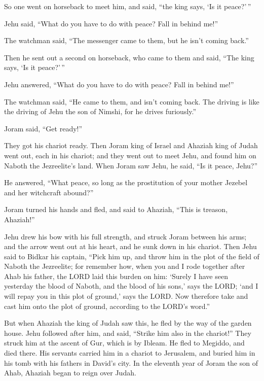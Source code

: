  So one went on horseback to meet him, and said, ``the
king says, `Is it peace?'\,''

Jehu said, ``What do you have to do with peace? Fall in behind me!''

The watchman said, ``The messenger came to them, but he isn't coming
back.''

 Then he sent out a second on horseback, who came to them
and said, ``The king says, `Is it peace?'\,''

Jehu answered, ``What do you have to do with peace? Fall in behind me!''

 The watchman said, ``He came to them, and isn't coming
back. The driving is like the driving of Jehu the son of Nimshi, for he
drives furiously.''

 Joram said, ``Get ready!''

They got his chariot ready. Then Joram king of Israel and Ahaziah king
of Judah went out, each in his chariot; and they went out to meet Jehu,
and found him on Naboth the Jezreelite's land.  When
Joram saw Jehu, he said, ``Is it peace, Jehu?''

He answered, ``What peace, so long as the prostitution of your mother
Jezebel and her witchcraft abound?''

 Joram turned his hands and fled, and said to Ahaziah,
``This is treason, Ahaziah!''

 Jehu drew his bow with his full strength, and struck
Joram between his arms; and the arrow went out at his heart, and he sunk
down in his chariot.  Then Jehu said to Bidkar his
captain, ``Pick him up, and throw him in the plot of the field of Naboth
the Jezreelite; for remember how, when you and I rode together after
Ahab his father, the LORD laid this burden on him: 
`Surely I have seen yesterday the blood of Naboth, and the blood of his
sons,' says the LORD; `and I will repay you in this plot of ground,'
says the LORD. Now therefore take and cast him onto the plot of ground,
according to the LORD's word.''

 But when Ahaziah the king of Judah saw this, he fled by
the way of the garden house. Jehu followed after him, and said, ``Strike
him also in the chariot!'' They struck him at the ascent of Gur, which
is by Ibleam. He fled to Megiddo, and died there.  His
servants carried him in a chariot to Jerusalem, and buried him in his
tomb with his fathers in David's city.  In the eleventh
year of Joram the son of Ahab, Ahaziah began to reign over Judah.

